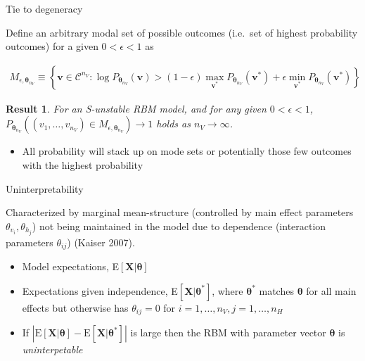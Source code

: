 \documentclass[ignorenonframetext,]{beamer}
\providecommand{\tightlist}{%
  \setlength{\itemsep}{0pt}\setlength{\parskip}{0pt}}
\newtheorem{result}{Result}
\theoremstyle{definition}
\newcommand{\nv}{{n_{\scriptscriptstyle V}}}
\newcommand{\nh}{{n_{\scriptscriptstyle H}}}
\begin{document}
\begin{frame}{Tie to degeneracy}
\protect\hypertarget{tie-to-degeneracy}{}

Define an arbitrary modal set of possible outcomes (i.e.~set of highest
probability outcomes) for a given \(0 < \epsilon < 1\) as

\small

\begin{align*}
M_{\epsilon, \boldsymbol \theta_\nv} \equiv \left\{\boldsymbol v \in \mathcal{C}^\nv: \log P_{\boldsymbol \theta_\nv}(\boldsymbol v) > (1-\epsilon)\max\limits_{\boldsymbol v^*}P_{\boldsymbol \theta_\nv}(\boldsymbol v^*) + \epsilon\min\limits_{\boldsymbol v^*}P_{\boldsymbol \theta_\nv}(\boldsymbol v^*) \right\}
\end{align*} \normalsize

\begin{result}
\label{prop:degen}
For an S-unstable RBM model, and for any given $0 < \epsilon < 1$, $P_{\boldsymbol \theta_\nv}\left((v_1, \dots, v_\nv) \in M_{\epsilon, \boldsymbol \theta_\nv}\right) \rightarrow 1$ holds as $\nv \rightarrow \infty$.
\end{result}

\begin{itemize}
\tightlist
\item
  All probability will stack up on mode sets or potentially those few
  outcomes with the highest probability
\end{itemize}

\end{frame}

\begin{frame}{Uninterpretability}
\protect\hypertarget{uninterpretability}{}

\begin{definition}[Uninterpretability]
Characterized by marginal mean-structure (controlled by main effect parameters $\theta_{v_i}, \theta_{h_j}$) not being maintained in the model due to dependence (interaction parameters $\theta_{ij}$) (Kaiser 2007).
\end{definition}

\begin{itemize}
\tightlist
\item
  Model expectations,
  E\(\left[\boldsymbol X | \boldsymbol \theta\right]\)
\item
  Expectations given independence,
  E\(\left[\boldsymbol X | \boldsymbol \theta^* \right]\), where
  \(\boldsymbol \theta^*\) matches \(\boldsymbol \theta\) for all main
  effects but otherwise has \(\theta_{ij} = 0\) for
  \(i = 1, \dots, \nv, j = 1, \dots, \nh\)
\item
  If
  \(|\text{E}\left[\boldsymbol X | \boldsymbol \theta\right] - \text{E}\left[\boldsymbol X | \boldsymbol \theta^*\right]|\)
  is large then the RBM with parameter vector \(\boldsymbol \theta\) is
  \emph{uninterpetable}
\end{itemize}

\end{frame}
\end{document}

